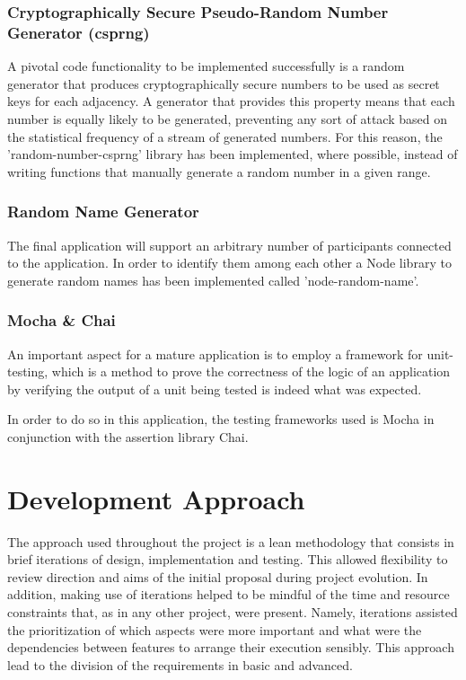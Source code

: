 \subsubsection{Cryptographically Secure Pseudo-Random Number Generator (csprng)} \label{sec:csprng}
A pivotal code functionality to be implemented successfully is a random generator that produces cryptographically secure numbers to be used as secret keys for each adjacency. A generator that provides this property means that each number is equally likely to be generated, preventing any sort of attack based on the statistical frequency of a stream of generated numbers. 
For this reason, the 'random-number-csprng' library has been implemented, where possible, instead of writing functions that manually generate a random number in a given range.

\subsubsection{Random Name Generator}
The final application will support an arbitrary number of participants connected to the application. In order to identify them among each other a Node library to generate random names has been implemented called 'node-random-name'. 

\subsubsection{Mocha \& Chai} \label{sec:testingFrameworks}
An important aspect for a mature application is to employ a framework for unit-testing, which is a method to prove the correctness of the logic of an application by verifying the output of a unit being tested is indeed what was expected.

In order to do so in this application, the testing frameworks used is Mocha in conjunction with the assertion library Chai. 


\section{Development Approach}
The approach used throughout the project is a lean methodology that consists in brief iterations of design, implementation and testing. This allowed flexibility to review direction and aims of the initial proposal during project evolution. In addition, making use of iterations helped to be mindful of the time and resource constraints that, as in any other project, were present. Namely, iterations assisted the prioritization of which aspects were more important and what were the dependencies between features to arrange their execution sensibly. This approach lead to the division of the requirements in basic and advanced.



